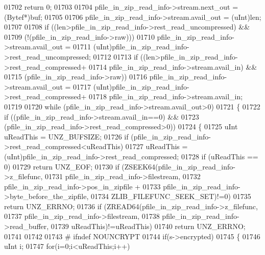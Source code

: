 \begin{DoxyCode}
01702         \textcolor{keywordflow}{return} 0;
01703 
01704     pfile\_in\_zip\_read\_info->stream.next\_out = (Bytef*)buf;
01705 
01706     pfile\_in\_zip\_read\_info->stream.avail\_out = (uInt)len;
01707 
01708     \textcolor{keywordflow}{if} ((len>pfile\_in\_zip\_read\_info->rest\_read\_uncompressed) &&
01709         (!(pfile\_in\_zip\_read\_info->raw)))
01710         pfile\_in\_zip\_read\_info->stream.avail\_out =
01711             (uInt)pfile\_in\_zip\_read\_info->rest\_read\_uncompressed;
01712 
01713     \textcolor{keywordflow}{if} ((len>pfile\_in\_zip\_read\_info->rest\_read\_compressed+
01714            pfile\_in\_zip\_read\_info->stream.avail\_in) &&
01715          (pfile\_in\_zip\_read\_info->raw))
01716         pfile\_in\_zip\_read\_info->stream.avail\_out =
01717             (uInt)pfile\_in\_zip\_read\_info->rest\_read\_compressed+
01718             pfile\_in\_zip\_read\_info->stream.avail\_in;
01719 
01720     while (pfile\_in\_zip\_read\_info->stream.avail\_out>0)
01721     \{
01722         \textcolor{keywordflow}{if} ((pfile\_in\_zip\_read\_info->stream.avail\_in==0) &&
01723             (pfile\_in\_zip\_read\_info->rest\_read\_compressed>0))
01724         \{
01725             uInt uReadThis = UNZ\_BUFSIZE;
01726             \textcolor{keywordflow}{if} (pfile\_in\_zip\_read\_info->rest\_read\_compressed<uReadThis)
01727                 uReadThis = (uInt)pfile\_in\_zip\_read\_info->rest\_read\_compressed;
01728             if (uReadThis == 0)
01729                 \textcolor{keywordflow}{return} UNZ\_EOF;
01730             \textcolor{keywordflow}{if} (ZSEEK64(pfile\_in\_zip\_read\_info->z\_filefunc,
01731                       pfile\_in\_zip\_read\_info->filestream,
01732                       pfile\_in\_zip\_read\_info->pos\_in\_zipfile +
01733                          pfile\_in\_zip\_read\_info->byte\_before\_the\_zipfile,
01734                          ZLIB\_FILEFUNC\_SEEK\_SET)!=0)
01735                 \textcolor{keywordflow}{return} UNZ\_ERRNO;
01736             \textcolor{keywordflow}{if} (ZREAD64(pfile\_in\_zip\_read\_info->z\_filefunc,
01737                       pfile\_in\_zip\_read\_info->filestream,
01738                       pfile\_in\_zip\_read\_info->read\_buffer,
01739                       uReadThis)!=uReadThis)
01740                 \textcolor{keywordflow}{return} UNZ\_ERRNO;
01741 
01742 
01743 \textcolor{preprocessor}{#            ifndef NOUNCRYPT}
01744             \textcolor{keywordflow}{if}(s->encrypted)
01745             \{
01746                 uInt i;
01747                 \textcolor{keywordflow}{for}(i=0;i<uReadThis;i++)

\end{DoxyCode}
